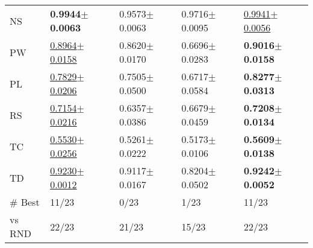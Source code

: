 \begin{tabular}{lllll}
NS & \textbf{0.9944$\pm$0.0063} & 0.9573$\pm$0.0063 & 0.9716$\pm$0.0095 & \underline{0.9941$\pm$0.0056} \\
PW & \underline{0.8964$\pm$0.0158} & 0.8620$\pm$0.0170 & 0.6696$\pm$0.0283 & \textbf{0.9016$\pm$0.0158} \\
PL & \underline{0.7829$\pm$0.0206} & 0.7505$\pm$0.0500 & 0.6717$\pm$0.0584 & \textbf{0.8277$\pm$0.0313} \\
RS & \underline{0.7154$\pm$0.0216} & 0.6357$\pm$0.0386 & 0.6679$\pm$0.0459 & \textbf{0.7208$\pm$0.0134} \\
TC & \underline{0.5530$\pm$0.0256} & 0.5261$\pm$0.0222 & 0.5173$\pm$0.0106 & \textbf{0.5609$\pm$0.0138} \\
TD & \underline{0.9230$\pm$0.0012} & 0.9117$\pm$0.0167 & 0.8204$\pm$0.0502 & \textbf{0.9242$\pm$0.0052} \\
\midrule
\# Best & 11/23 & 0/23 & 1/23 & 11/23 \\
vs RND & 22/23 & 21/23 & 15/23 & 22/23 \\
\bottomrule
\end{tabular}
